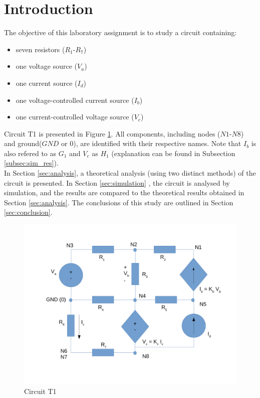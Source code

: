 
\section{Introduction}
\label{sec:introduction}


The objective of this laboratory assignment is to study a circuit containing:
\begin{itemize}
	\item seven resistors ($R_1$-$R_7$)
	\item one voltage source ($V_a$)
	\item one current source ($I_d$)
	\item one voltage-controlled current source ($I_b$)
	\item one current-controlled voltage source ($V_c$)
\end{itemize}


Circuit T1 is presented in Figure \ref{fig:Desenho_t1}. All components, including nodes
($N1$-$N8$) and ground($GND$ or $0$), are identified with their respective names. Note
that $I_b$ is also refered to as $G_1$ and $V_c$ as $H_1$ (explanation can be found in 
Subsection \ref{subsec:sim_res}). \\

In Section \ref{sec:analysis}, a theoretical analysis (using two distinct methods) of
the circuit is presented. In Section \ref{sec:simulation} , the circuit is analysed by
simulation, and the results are compared to the theoretical results obtained in Section
\ref{sec:analysis}. The conclusions of this study are outlined in Section \ref{sec:conclusion}.


\begin{figure}[h]
	\centering
	\includegraphics[width=0.85\linewidth]{dsnh_t1.pdf}
	\caption{Circuit T1}
\label{fig:Desenho_t1}
\end{figure}

